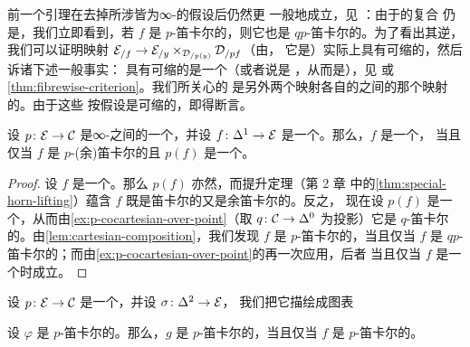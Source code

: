 \begin{remark}\label{rem:cartesian-composition-general}
前一个引理在去掉所涉\trSimplicialSets{}皆为∞-\trCategories{}的假设后仍然更
一般地成立，见 \cite[Proposition 2.4.1.3]{Lur09}：由于\trTrivialFibration{}的复合
仍是\trTrivialFibration{}，我们立即看到，若 $f$ 是 $p$-笛卡尔的，则它也是
$qp$-笛卡尔的。为了看出其逆，我们可以证明映射
$\mathcal{E}_{/f} \to \mathcal{E}_{/y} \times_{\mathcal{D}_{/p(y)}} \mathcal{D}_{/pf}$（由\trThreeForTwoProperty{}，
它是\trJoyalEquivalence{}）实际上具有可缩的\trFibre{}，然后诉诸下述一般事实：
具有可缩\trFibre{}的\trRightFibration{}是一个\trTrivialFibration{}（或者说是%
\trJoyalEquivalence{}，从而是\trTrivialFibration{}），见 \cite[Lemma 2.1.3.4]{Lur09} 或\cref{thm:fibrewise-criterion}。我们所关心的%
\trFibre{}是另外两个映射各自的\trFibre{}之间的那个映射的\trFibre{}。由于这些%
\trFibre{}按假设是可缩的，即得断言。
\end{remark}

\begin{lemma}\label{lem:equivalence-cartesian}
设 $p\colon \mathcal{E} \to \mathcal{C}$ 是∞-\trCategories{}之间的一个\trInnerFibration{}，并设
$f\colon \Delta^1 \to \mathcal{E}$ 是一个\trMorphism{}。那么，$f$ 是一个\trEquivalence{}，
当且仅当 $f$ 是 $p$-(余)笛卡尔的且 $p(f)$ 是一个\trEquivalence{}。
\end{lemma}

\begin{proof}
设 $f$ 是一个\trEquivalence{}。那么 $p(f)$ 亦然，而\trJoyal{}提升定理（第 2 章
中的\cref{thm:special-horn-lifting}）蕴含 $f$ 既是笛卡尔的又是余笛卡尔的。反之，
现在设 $p(f)$ 是一个\trEquivalence{}，从而由\cref{ex:p-cocartesian-over-point}（取 $q\colon \mathcal{C} \to \Delta^0$
为投影）它是 $q$-笛卡尔的。由\cref{lem:cartesian-composition}，我们发现 $f$ 是
$p$-笛卡尔的，当且仅当 $f$ 是 $qp$-笛卡尔的；而由\cref{ex:p-cocartesian-over-point}的再一次应用，后者
当且仅当 $f$ 是一个\trEquivalence{}时成立。
\end{proof}

\begin{lemma}\label{lem:cartesian-three-for-two}
设 $p\colon \mathcal{E} \to \mathcal{C}$ 是一个\trInnerFibration{}，并设 $\sigma\colon \Delta^2 \to \mathcal{E}$，
我们把它描绘成图表
\begin{center}
\end{center}
设 $\varphi$ 是 $p$-笛卡尔的。那么，$g$ 是 $p$-笛卡尔的，当且仅当 $f$ 是
$p$-笛卡尔的。
\end{lemma}

